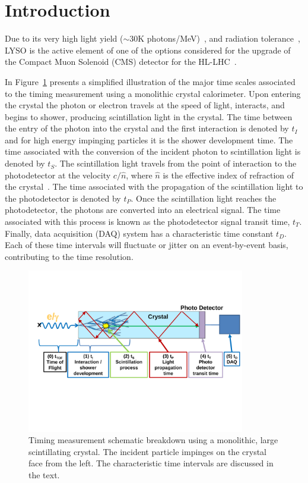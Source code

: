 \section{Introduction}
Due to its very high light yield 
($\sim 30$K photons/MeV)~\cite{LYSOProperties}, and radiation 
tolerance~\cite{5402126, 4291695, 5402125, Dissertori:2013rma}, LYSO
is the active element of one of the options considered for the upgrade of the
Compact Muon Solenoid (CMS) detector for the HL-LHC~\cite{Contardo:1605208}. 

In Figure~\ref{fig:ScintillatorTiming} presents a simplified illustration of
the major time scales associated to the timing measurement using a monolithic
crystal calorimeter. Upon entering the crystal the photon or electron travels
at the speed of light, interacts, and begins to shower, producing scintillation light in the crystal. 
The time between the entry of the photon into the crystal and the first interaction is denoted by
$t_I$ and for high energy impinging particles it is the shower development time. 
The time associated with the conversion of the incident photon to
scintillation light is denoted by $t_S$. The scintillation light travels from
the point of interaction to the photodetector at the velocity $c/\hat{n}$, where
$\hat{n}$ is the effective index of refraction of the crystal~\cite{Moses}. The
time associated with the propagation of the scintillation light to the photodetector 
is denoted by $t_P$. Once the scintillation light reaches the photodetector, the  photons 
are converted into an electrical signal. The time associated with this process is known as the
photodetector signal transit time, $t_T$. Finally, data acquisition (DAQ)
system has a characteristic time constant $t_D$. Each of these time intervals will fluctuate or 
jitter on an event-by-event basis, contributing to the time resolution.
\begin{figure}[h] \centering
\includegraphics[width=0.85\textwidth]{figs/ScintillatorTiming_v4}
\caption{\small Timing measurement schematic breakdown using a monolithic, large scintillating crystal. 
The incident particle impinges on the crystal face from the left. The characteristic time intervals  are discussed 
in the text.}
\label{fig:ScintillatorTiming}
\end{figure}
